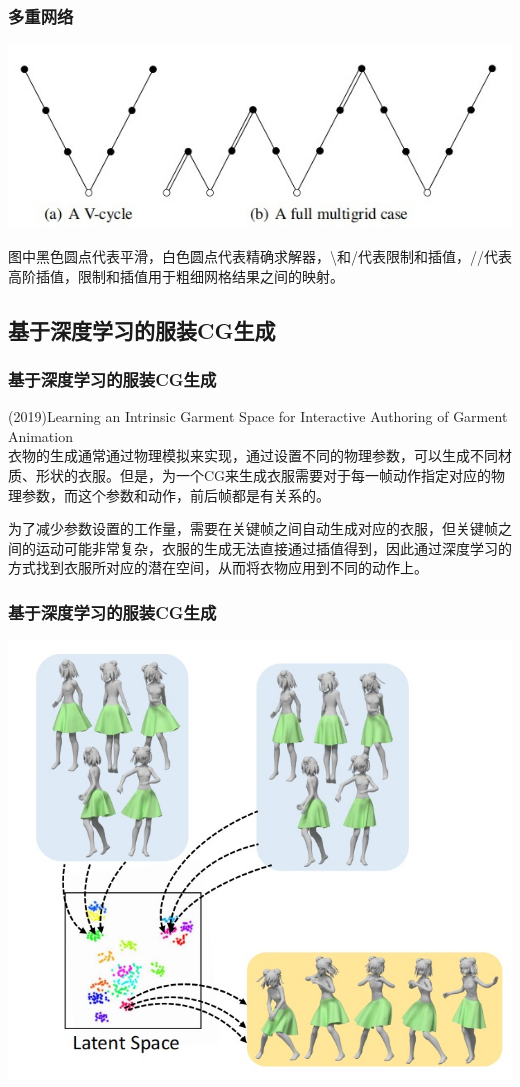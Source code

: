 \documentclass[aspectratio=43]{ctexbeamer}
\begin{document}
\begin{frame}
  \frametitle{多重网络}
        \begin{center}
            \includegraphics[width=0.7\linewidth]{./fig/multigrid.jpg}
        \end{center}
		
		图中黑色圆点代表平滑，白色圆点代表精确求解器，\textbackslash 和/代表限制和插值，//代表高阶插值，限制和插值用于粗细网格结果之间的映射。
\end{frame}

\subsection{基于深度学习的服装CG生成}
\begin{frame}
  \frametitle{基于深度学习的服装CG生成}
	(2019)Learning an Intrinsic Garment Space for Interactive Authoring of Garment Animation\\[10pt]

		\; \;衣物的生成通常通过物理模拟来实现，通过设置不同的物理参数，可以生成不同材质、形状的衣服。但是，为一个CG来生成衣服需要对于每一帧动作指定对应的物理参数，而这个参数和动作，前后帧都是有关系的。

		\; \;为了减少参数设置的工作量，需要在关键帧之间自动生成对应的衣服，但关键帧之间的运动可能非常复杂，衣服的生成无法直接通过插值得到，因此通过深度学习的方式找到衣服所对应的潜在空间，从而将衣物应用到不同的动作上。
\end{frame}

\begin{frame}
  \frametitle{基于深度学习的服装CG生成}
        \begin{center}
            \includegraphics[width=0.7\linewidth]{./fig/潜在空间.jpg}
        \end{center}
\end{frame}
\end{document}
